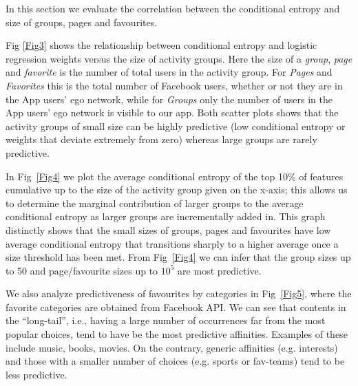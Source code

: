 

In this section we evaluate the correlation between the conditional
entropy and size of groups, pages and favourites.


Fig \ref{Fig3} shows the relationship between conditional
    entropy and logistic regression weights versus the size of activity
    groups. Here the size of a {\em group}, {\em page} and {\em favorite} 
    is the number of total users in the activity group. 
    For {\em Pages} and {\em Favorites} this is the total number of Facebook users, 
    whether or not they are in the App users' ego network, while for 
    {\em Groups} only the number of users in the App users' ego network is visible to our app.
    Both scatter plots shows that the activity groups of small size can be
    highly predictive (low conditional entropy or weights that deviate
    extremely from zero) whereas large groups are rarely predictive.

In Fig~\ref{Fig4} we plot the average conditional entropy of the top
    10\% of features cumulative up to the size of the activity group given on the
    x-axis; this allows us to determine the marginal contribution of
    larger groups to the average conditional entropy as larger groups
    are incrementally added in.  This graph 
    distinctly shows that the small sizes of groups, pages and favourites
    have low average conditional entropy that transitions sharply to a
    higher average once a size threshold has been met.  From 
    Fig~\ref{Fig4} we can infer that the group sizes up to 50 and
    page/favourite sizes up to $10^{5}$ are most predictive.


 We also analyze predictiveness of favourites by categories in
    Fig~\ref{Fig5}, where the favorite categories are obtained from Facebook API.  
    We can see that contents in the ``long-tail'', i.e.,  
    having a large number of occurrences far from the most popular choices, 
    tend to have be the most predictive affinities. Examples of these include
    music, books, movies. On the contrary, generic affinities (e.g. interests) and 
    those with a smaller number of choices (e.g. sports or fav-teams) 
    tend to be less predictive. 

